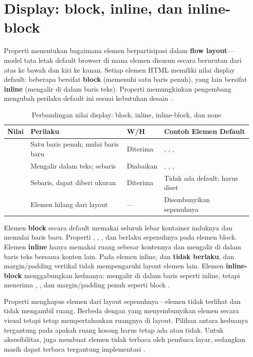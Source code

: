 ﻿\section{Display: block, inline, dan inline-block}

Properti  menentukan bagaimana elemen berpartisipasi dalam \textbf{flow layout}---model tata letak default browser di mana elemen disusun secara berurutan dari atas ke bawah dan kiri ke kanan. Setiap elemen HTML memiliki nilai display default: beberapa bersifat \textbf{block} (memenuhi satu baris penuh), yang lain bersifat \textbf{inline} (mengalir di dalam baris teks). Properti  memungkinkan pengembang mengubah perilaku default ini sesuai kebutuhan desain \cite{mdnCss}.

\begin{table}[H]
\centering
\begin{tabular}{|P{2.5cm}|P{3cm}|P{2.5cm}|P{4cm}|}
\hline
\textbf{Nilai} & \textbf{Perilaku} & \textbf{W/H} & \textbf{Contoh Elemen Default} \\
\hline
{} & Satu baris penuh; mulai baris baru & Diterima & , , ,  \\
\hline
{} & Mengalir dalam teks; sebaris & Diabaikan & , , ,  \\
\hline
{} & Sebaris, dapat diberi ukuran & Diterima & Tidak ada default; harus diset \\
\hline
{} & Elemen hilang dari layout & --- & Disembunyikan sepenuhnya \\
\hline
\end{tabular}
\caption{Perbandingan nilai display: block, inline, inline-block, dan none}
\end{table}

Elemen \textbf{block} secara default memakai seluruh lebar kontainer induknya dan memulai baris baru. Properti , , , dan  berlaku sepenuhnya pada elemen block. Elemen \textbf{inline} hanya memakai ruang sebesar kontennya dan mengalir di dalam baris teks bersama konten lain. Pada elemen inline,  dan  \textbf{tidak berlaku}, dan margin/padding vertikal tidak mempengaruhi layout elemen lain. Elemen \textbf{inline-block} menggabungkan keduanya: mengalir di dalam baris seperti inline, tetapi menerima , , dan margin/padding penuh seperti block \cite{webdevCss}.

Properti  menghapus elemen dari layout sepenuhnya---elemen tidak terlihat dan tidak mengambil ruang. Berbeda dengan  yang menyembunyikan elemen secara visual tetapi tetap mempertahankan ruangnya di layout. Pilihan antara keduanya tergantung pada apakah ruang kosong harus tetap ada atau tidak. Untuk aksesibilitas,  juga membuat elemen tidak terbaca oleh pembaca layar, sedangkan  masih dapat terbaca tergantung implementasi \cite{mdnCss}.

